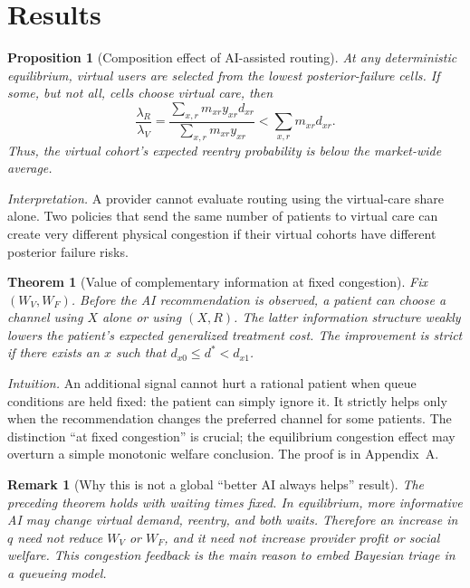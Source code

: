 \documentclass[11pt]{article}
\newtheorem{theorem}{Theorem}
\newtheorem{proposition}{Proposition}
\newtheorem{remark}{Remark}
\begin{document}
\section{Results}

\begin{proposition}[Composition effect of AI-assisted routing]
At any deterministic equilibrium, virtual users are selected from the lowest posterior-failure cells.  If some, but not all, cells choose virtual care, then
\begin{equation}
 \frac{\lambda_R}{\lambda_V}
 =\frac{\sum_{x,r}m_{xr}y_{xr}d_{xr}}
 {\sum_{x,r}m_{xr}y_{xr}}
 <\sum_{x,r}m_{xr}d_{xr}.
 \label{eq:composition}
\end{equation}
Thus, the virtual cohort's expected reentry probability is below the market-wide average.
\end{proposition}

\noindent\emph{Interpretation.}  A provider cannot evaluate routing using the virtual-care share alone.  Two policies that send the same number of patients to virtual care can create very different physical congestion if their virtual cohorts have different posterior failure risks.

\begin{theorem}[Value of complementary information at fixed congestion]
Fix $(W_V,W_F)$.  Before the AI recommendation is observed, a patient can choose a channel using $X$ alone or using $(X,R)$.  The latter information structure weakly lowers the patient's expected generalized treatment cost.  The improvement is strict if there exists an $x$ such that $d_{x0}\leq d^*<d_{x1}$.
\end{theorem}

\noindent\emph{Intuition.}  An additional signal cannot hurt a rational patient when queue conditions are held fixed: the patient can simply ignore it.  It strictly helps only when the recommendation changes the preferred channel for some patients.  The distinction ``at fixed congestion'' is crucial; the equilibrium congestion effect may overturn a simple monotonic welfare conclusion.  The proof is in Appendix~A.

\begin{remark}[Why this is not a global ``better AI always helps'' result]
The preceding theorem holds with waiting times fixed.  In equilibrium, more informative AI may change virtual demand, reentry, and both waits.  Therefore an increase in $q$ need not reduce $W_V$ or $W_F$, and it need not increase provider profit or social welfare.  This congestion feedback is the main reason to embed Bayesian triage in a queueing model.
\end{remark}
\end{document}
